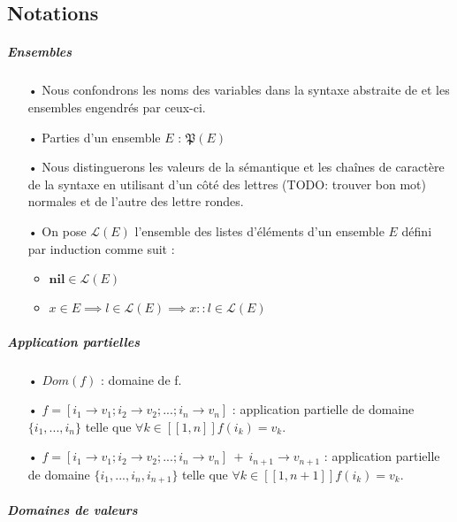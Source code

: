  
\begin{appendices}
\chapter{Notations}
\paragraph{Ensembles}
\begin{itemize}
\item[•] Nous confondrons les noms des variables dans la syntaxe abstraite de \compo{} et les ensembles engendrés par ceux-ci.
\item[•] Parties d'un ensemble $E$ : $\mathfrak{P}(E)$
\item[•] Nous distinguerons les valeurs de la sémantique et les chaînes de caractère de la syntaxe en utilisant d'un côté des lettres (TODO: trouver bon mot) normales et de l'autre des lettre rondes.
\item[•] On pose $\mathcal{L}(E)$ l'ensemble  des listes d'éléments d'un ensemble $E$ défini par induction comme suit : 
\begin{itemize}
\item $ \mathbf{nil} \in \mathcal{L}(E)$
\item $ x \in E  \implies l \in \mathcal{L}(E) \implies x::l \in \mathcal{L}(E) $
\end{itemize}


\end{itemize}

\paragraph{Application partielles} 
\begin{itemize}
\item[•] $Dom(f)$ : domaine de f.
\item[•] $f = [i_1 \rightarrow v_1; i_2 \rightarrow v_2 ; ... ; i_n \rightarrow v_n]$ : application partielle de domaine $\{i_1, ... , i_n\}$ telle que $\forall k \in [\![1,n]\!]f(i_k) = v_k$.
\item[•] $f = [i_1 \rightarrow v_1; i_2 \rightarrow v_2 ; ... ; i_n \rightarrow v_n] ~+~ i_{n+1} \rightarrow v_{n+1}$ : application partielle de domaine $\{i_1, ... , i_n, i_{n+1}\}$ telle que $\forall k \in [\![1,n+1]\!]f(i_k) = v_k$.
\end{itemize}


\paragraph{Domaines de valeurs}


\end{appendices}
